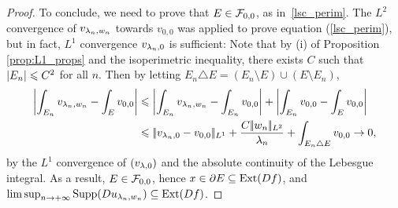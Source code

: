 \begin{proof}
To conclude, we need to prove that $E\in \mathcal{F}_{0,0}$, as in~\eqref{lsc_perim}. The $L^2$ convergence of 
$v_{\lambda_n,w_n}$ towards $v_{0,0}$ was applied to prove equation (\ref{lsc_perim}), but in fact, $L^1$ convergence $v_{\lambda_n,0}$ is sufficient:
Note that by (i) of Proposition \ref{prop:L1_props}  and the isoperimetric inequality, there exists $C$ such that $\left| E_n \right|\leqslant C^2$ for all $n$. Then by letting $E_n\triangle E = (E_n\setminus E) \cup (E\setminus E_n)$,
\begin{align*}
\left| \int_{E_n} v_{\lambda_n,w_n} -\int_E v_{0,0} \right|&\leqslant \left|  \int_{E_n} v_{\lambda_n,w_n} - \int_{E_n} v_{0,0} \right| +\left|  \int_{E_n} v_{0,0} - \int_E v_{0,0}  \right|\\
&\leqslant |\!| v_{\lambda_n,0}  - v_{0,0} |\!|_{L^1} +\frac{C |\!| w_n |\!|_{L^2}}{\lambda_n} + \int_{E_n\triangle E}v_{0,0} \to 0,
\end{align*}
by the $L^1$ convergence of $(v_{\lambda,0})$ and the absolute continuity of the Lebesgue integral.
As a result,  $E\in \mathcal{F}_{0,0}$, hence $x\in \partial E\subseteq \operatorname{Ext}(Df)$, and $\limsup_{n\to+\infty} \operatorname{Supp}(Du_{\lambda_n,w_n})\subseteq \operatorname{Ext}(Df)$.
\end{proof}
